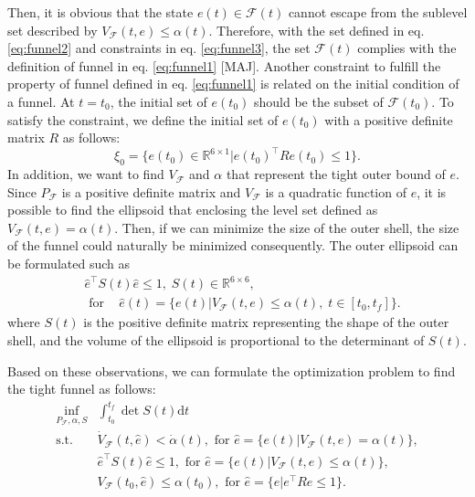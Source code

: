 \documentclass[letterpaper, 10 pt, conference]{ieeeconf}  %
\begin{document}
Then, it is obvious that the state $e(t) \in \mathcal{F}(t)$ cannot escape from the sublevel set described by $V_\mathcal{F}(t,e) \leq \alpha(t)$.
Therefore, with the set defined in eq. \eqref{eq:funnel2} and constraints in eq. \eqref{eq:funnel3}, 
the set $\mathcal{F}(t)$ complies with the definition of funnel in eq. \eqref{eq:funnel1} [MAJ]. 
Another constraint to fulfill the property of funnel defined in eq. \eqref{eq:funnel1} is related on the initial condition of a funnel. 
At $t = t_0$, the initial set of $e(t_0)$ should be the subset of $\mathcal{F}(t_0)$. 
To satisfy the constraint, we define the initial set of $e(t_0)$ with a positive definite matrix $R$ as follows:
\begin{equation}
\xi_0 = \{e(t_0) \in \mathbb{R}^{6\times1}|e(t_0)^\intercal R e(t_0) \leq 1\}.
\end{equation} 
In addition, we want to find $V_\mathcal{F}$ and $\alpha$ that represent the tight outer bound of $e$. 
Since $P_\mathcal{F}$ is a positive definite matrix and $V_\mathcal{F}$ is a quadratic function of $e$, 
it is possible to find the ellipsoid that enclosing the level set defined as $V_\mathcal{F}(t,e) = \alpha(t)$.
Then, if we can minimize the size of the outer shell, the size of the funnel could naturally be minimized consequently.
The outer ellipsoid can be formulated such as
\begin{align}
&\hat{e}^\intercal S(t) \hat{e} \leq 1,\;S(t) \in \mathbb{R}^{6\times 6}, \nonumber \\
&\text{ for }\;\;\;\hat{e}(t) = \{e(t)|V_\mathcal{F}(t,e) \leq \alpha(t),\;t \in [t_0,t_f]\}. \nonumber
\end{align}
where $S(t)$ is the positive definite matrix representing the shape of the outer shell, and the volume of the ellipsoid is proportional to the determinant of $S(t)$.

Based on these observations, we can formulate the optimization problem to find the tight funnel as follows:
\begin{equation}
\begin{array}{rl}
\displaystyle{\inf_{P_\mathcal{F},\alpha,S}} & \int_{t_0}^{t_f} \det{S(t)}\text{d}t \label{eq:optim1} \\
\displaystyle{\text{s.t.}}& \dot{V}_\mathcal{F}(t,\hat{e}) < \dot{\alpha}(t),\text{ for }\hat{e} = \{e(t)|V_\mathcal{F}(t,e) = \alpha(t)\}, \nonumber \\
& \hat{e}^\intercal S(t) \hat{e} \leq 1,\text{ for }\hat{e} = \{e(t)|V_\mathcal{F}(t,e) \leq \alpha(t)\}, \nonumber \\
& V_\mathcal{F}(t_0,\hat{e}) \leq \alpha(t_0),\text{ for }\hat{e} = \{e|e^\intercal R e \leq 1\}. \nonumber
\end{array}
\end{equation}
\end{document}
